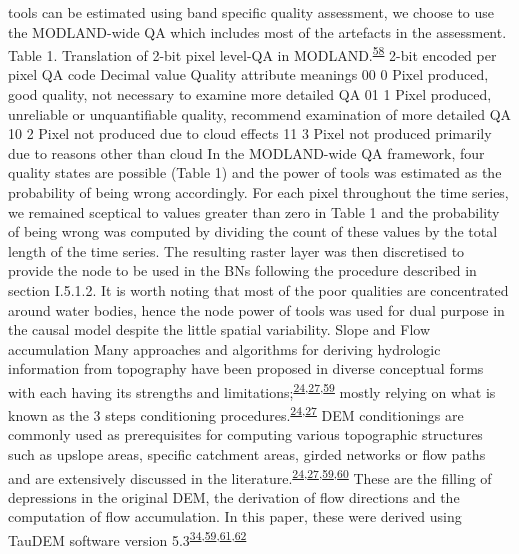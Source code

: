 \documentclass[12pt,oneside]{article}
\begin{document}
tools can be estimated using band specific quality assessment, we choose
to use the MODLAND-wide QA which includes most of the artefacts in the
assessment. Table 1. Translation of 2-bit pixel level-QA in
MODLAND.\textsuperscript{\protect\hyperlink{ref-Roy_et_al_2002}{58}}
2-bit encoded per pixel QA code Decimal value Quality attribute meanings
00 0 Pixel produced, good quality, not necessary to examine more
detailed QA 01 1 Pixel produced, unreliable or unquantifiable quality,
recommend examination of more detailed QA 10 2 Pixel not produced due to
cloud effects 11 3 Pixel not produced primarily due to reasons other
than cloud In the MODLAND-wide QA framework, four quality states are
possible (Table 1) and the power of tools was estimated as the
probability of being wrong accordingly. For each pixel throughout the
time series, we remained sceptical to values greater than zero in Table
1 and the probability of being wrong was computed by dividing the count
of these values by the total length of the time series. The resulting
raster layer was then discretised to provide the node to be used in the
BNs following the procedure described in section I.5.1.2. It is worth
noting that most of the poor qualities are concentrated around water
bodies, hence the node power of tools was used for dual purpose in the
causal model despite the little spatial variability. Slope and Flow
accumulation Many approaches and algorithms for deriving hydrologic
information from topography have been proposed in diverse conceptual
forms with each having its strengths and
limitations;\textsuperscript{\protect\hyperlink{ref-Arge_et_al_2003}{24},\protect\hyperlink{ref-Jenson_and_Domingue_1988}{27},\protect\hyperlink{ref-Tarboton_1997}{59}}
mostly relying on what is known as the 3 steps conditioning
procedures.\textsuperscript{\protect\hyperlink{ref-Arge_et_al_2003}{24},\protect\hyperlink{ref-Jenson_and_Domingue_1988}{27}}
DEM conditionings are commonly used as prerequisites for computing
various topographic structures such as upslope areas, specific catchment
areas, girded networks or flow paths and are extensively discussed in
the
literature.\textsuperscript{\protect\hyperlink{ref-Arge_et_al_2003}{24},\protect\hyperlink{ref-Jenson_and_Domingue_1988}{27},\protect\hyperlink{ref-Tarboton_1997}{59},\protect\hyperlink{ref-OCallaghan_Mark_1984}{60}}
These are the filling of depressions in the original DEM, the derivation
of flow directions and the computation of flow accumulation. In this
paper, these were derived using TauDEM software version
5.3\textsuperscript{\protect\hyperlink{ref-Yang_et_al_2006}{34},\protect\hyperlink{ref-Tarboton_1997}{59},\protect\hyperlink{ref-Tarboton_et_al_1991}{61},\protect\hyperlink{ref-Tesfa_et_al_2011}{62}}
\end{document}
